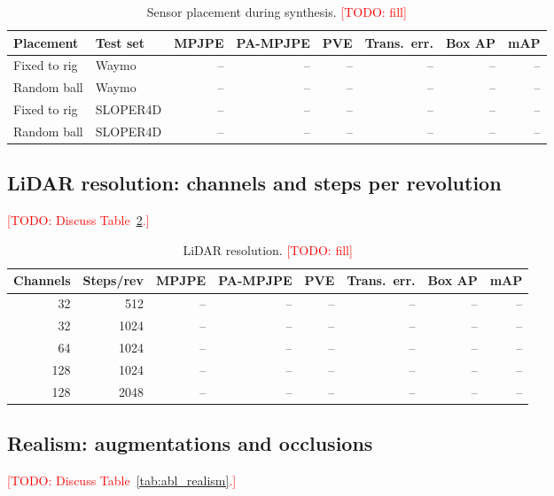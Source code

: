 \documentclass{egpubl}
\newcommand{\todo}[1]{\textcolor{red}{[TODO: #1]}}
\begin{document}
\begin{table}[t]
  \centering
  \caption{Sensor placement during synthesis. \todo{fill}}
  \label{tab:abl_extrinsics}
  \begin{tabular}{@{}llrrrrrr@{}}
    \toprule
    Placement & Test set & MPJPE & PA-MPJPE & PVE & Trans.\ err. & Box AP & mAP \\
    \midrule
    Fixed to rig & Waymo    & -- & -- & -- & -- & -- & -- \\
    Random ball  & Waymo    & -- & -- & -- & -- & -- & -- \\
    Fixed to rig & SLOPER4D & -- & -- & -- & -- & -- & -- \\
    Random ball  & SLOPER4D & -- & -- & -- & -- & -- & -- \\
    \bottomrule
  \end{tabular}
\end{table}

\subsection{LiDAR resolution: channels and steps per revolution}
\todo{Discuss Table~\ref{tab:abl_resolution}.}

\begin{table}[t]
  \centering
  \caption{LiDAR resolution. \todo{fill}}
  \label{tab:abl_resolution}
  \begin{tabular}{@{}rrrrrrrr@{}}
    \toprule
    Channels & Steps/rev & MPJPE & PA-MPJPE & PVE & Trans.\ err. & Box AP & mAP \\
    \midrule
    32  & 512  & -- & -- & -- & -- & -- & -- \\
    32  & 1024 & -- & -- & -- & -- & -- & -- \\
    64  & 1024 & -- & -- & -- & -- & -- & -- \\
    128 & 1024 & -- & -- & -- & -- & -- & -- \\
    128 & 2048 & -- & -- & -- & -- & -- & -- \\
    \bottomrule
  \end{tabular}
\end{table}

\subsection{Realism: augmentations and occlusions}
\todo{Discuss Table~\ref{tab:abl_realism}.}
\end{document}
